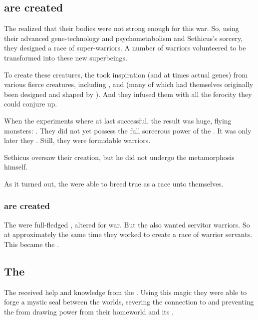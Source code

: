\subsection{\Dragons{} are created}
The \ophidians{} realized that their bodies were not strong enough for this war. 
So, using their advanced gene-technology and psychometabolism and Sethicus's \xsic{} sorcery, they designed a race of \ophidian{} super-warriors. 
A number of \ophidian{} warriors volunteered to be transformed into these new superbeings. 

To create these creatures, the \ophidians{} took inspiration (and at times actual genes) from various fierce creatures, including \nycans, \corgoroth{} and \vreiiden{} (many of which had themselves originally been designed and shaped by \ophidians). 
And they infused them with all the \xsic{} ferocity they could conjure up. 

When the experiments where at last successful, the result was huge, flying monsters: 
\Dragons. 
They did not yet possess the full \xsic{} sorcerous power of the \dzraicchenosses. 
It was only later they .
Still, they were formidable warriors. 

Sethicus oversaw their creation, but he did not undergo the metamorphosis himself. 

As it turned out, the \dragons{} were able to breed true as a race unto themselves. 





\subsubsection{\Cregorrs{} are created}
The \dragons{} were full-fledged \ophidians, altered for war. 
But the \ophidians{} also wanted servitor warriors. 
So at approximately the same time they worked to create a race of warrior servants. 
This became the \cregorrs.  









\subsection{The \CrystalSphere}
\index{\CrystalSphere}
The \ophidians{} received help and knowledge from the \xss{}. 
Using this magic they were able to forge a mystic seal between the worlds, severing the connection to \Erebos{} and preventing the \banes{} from drawing power from their homeworld and its \dweomer. 

